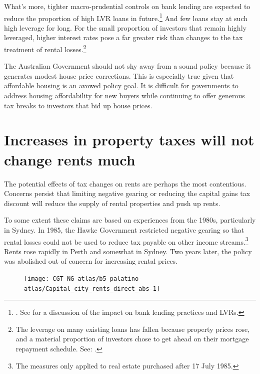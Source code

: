 What’s more, tighter macro-prudential controls on bank lending are expected to reduce the proportion of high LVR loans in future.\footnote{\textcite{APRA2014a}. See \textcite{Schlesinger2015} for a discussion of the impact on bank lending practices and LVRs.}  
  And few loans stay at such high leverage for long.  For the small proportion of investors that remain highly leveraged, higher interest rates pose a far greater risk than changes to the tax treatment of rental losses.\footnote{The leverage on many existing loans has fallen because property prices rose, and a material proportion of investors chose to get ahead on their mortgage repayment schedule. See: \textcite{RBA2015StatsMarginLending}.} 

The Australian Government should not shy away from a sound policy because it generates modest house price corrections. 
This is especially true given that affordable housing is an avowed policy goal. It is difficult for governments to address housing affordability for new buyers while continuing to offer generous tax breaks to investors that bid up house prices. 


\section{Increases in property taxes will not change rents much}\label{sec:Increases-property-taxes-will-not-change-rents}
The potential effects of tax changes on rents are perhaps the most contentious. Concerns persist that limiting negative gearing or reducing the capital gains tax discount will reduce the supply of rental properties and push up rents. 

To some extent these claims are based on experiences from the 1980s, particularly in Sydney. 
In 1985, the Hawke Government restricted negative gearing so that rental losses could not be used to reduce tax payable on other income streams.\footnote{\textcite[][20]{McKellInstitute2015SwitchingGears}  The measures only applied to real estate purchased after 17 July 1985.}
Rents rose rapidly in Perth and somewhat in Sydney. 
Two years later, the policy was abolished out of concern for increasing rental prices. 

\begin{figure}
\texttt{[image: CGT-NG-atlas/b5-palatino-atlas/Capital\_city\_rents\_direct\_abs-1]}
\end{figure}

